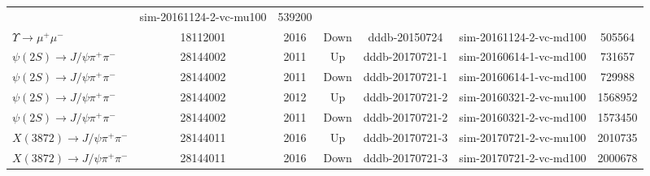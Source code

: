\begin{table}[htb!]
\begin{center}
{\begin{tabular}{l|c|c|c|c|c|c}
                                            & sim-20161124-2-vc-mu100
                                                      &  539200 \\
$\Upsilon \rightarrow \mu^+ \mu^-$ & 18112001 & 2016 & Down & dddb-20150724
                                                                   
                                            &  sim-20161124-2-vc-md100
                                                      & 505564 \\

$\psi(2S) \rightarrow J/\psi \pi^+ \pi^-$  &  28144002 & 2011 & Up &
                                                                   
                                  dddb-20170721-1          & sim-20160614-1-vc-md100
                                                      & 731657 \\
$\psi(2S) \rightarrow J/\psi \pi^+ \pi^-$  &  28144002  & 2011 & Down
                                    &  dddb-20170721-1 
                                                                   
                                            & sim-20160614-1-vc-md100
                                                      & 729988  \\
$\psi(2S) \rightarrow J/\psi \pi^+ \pi^-$  &  28144002 & 2012 & Up &
                                                                   
                     dddb-20170721-2                       & sim-20160321-2-vc-mu100
                                                      & 1568952 \\
$\psi(2S) \rightarrow J/\psi \pi^+ \pi^-$  & 28144002 & 2011 & Down &
                                                                   
                    dddb-20170721-2                        & sim-20160321-2-vc-md100
                                                      &  1573450 \\


$X(3872) \rightarrow J/\psi \pi^+ \pi^-$  & 28144011 & 2016 & Up &
                                                                   
                                 dddb-20170721-3           & sim-20170721-2-vc-mu100
                                                      &  2010735\\
$X(3872) \rightarrow J/\psi \pi^+ \pi^-$  & 28144011 & 2016 & Down &
                                       dddb-20170721-3                            
                                            & sim-20170721-2-vc-md100
                                                      &  2000678 \\


\end{tabular}}
\end{center}
\label{tab:mc}
\end{table}

